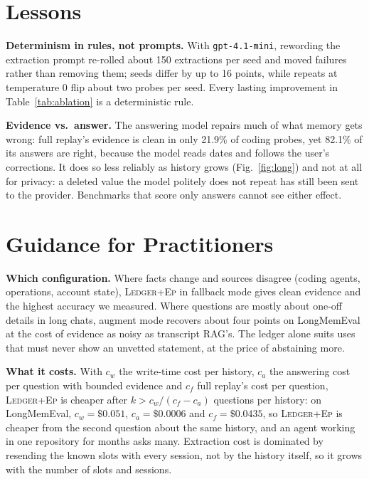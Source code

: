 \documentclass[10pt,conference]{IEEEtran}
\newcommand{\hyb}{\textsc{Ledger+Ep}}
\begin{document}
\section{Lessons}
\label{sec:lessons}

\textbf{Determinism in rules, not prompts.} With \texttt{gpt-4.1-mini},
rewording the extraction prompt re-rolled about 150 extractions per seed and
moved failures rather than removing them; seeds differ by up to 16 points,
while repeats at temperature 0 flip about two probes per seed. Every lasting
improvement in Table~\ref{tab:ablation} is a deterministic rule.

\textbf{Evidence vs.\ answer.} The answering model repairs much of what
memory gets wrong: full replay's evidence is clean in only 21.9\% of coding
probes, yet 82.1\% of its answers are right, because the model reads dates and
follows the user's corrections. It does so less reliably as history grows
(Fig.~\ref{fig:long}) and not at all for privacy: a deleted value the model
politely does not repeat has still been sent to the provider. Benchmarks that
score only answers cannot see either effect.

\section{Guidance for Practitioners}
\label{sec:guidance}

\textbf{Which configuration.} Where facts change and sources disagree (coding
agents, operations, account state), \hyb{} in fallback mode gives clean
evidence and the highest accuracy we measured. Where questions are mostly
about one-off details in long chats, augment mode recovers about four points
on LongMemEval at the cost of evidence as noisy as transcript RAG's. The
ledger alone suits uses that must never show an unvetted statement, at the
price of abstaining more.

\textbf{What it costs.} With $c_w$ the write-time cost per history, $c_a$ the
answering cost per question with bounded evidence and $c_f$ full replay's cost
per question, \hyb{} is cheaper after $k > c_w/(c_f - c_a)$ questions per
history: on LongMemEval, $c_w=\$0.051$, $c_a=\$0.0006$ and $c_f=\$0.0435$,
so \hyb{} is cheaper from the second question about the same history, and an
agent working in one repository for months asks many. Extraction cost is
dominated by resending the known slots with every session, not by the
history itself, so it grows with the number of slots and sessions.
\end{document}
